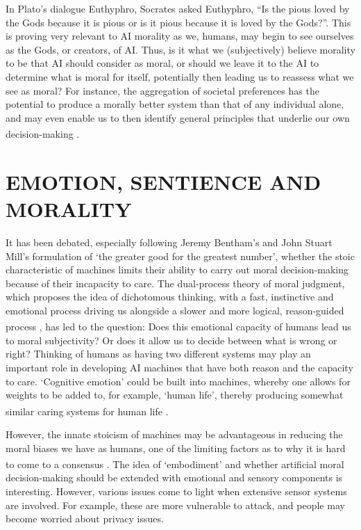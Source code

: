 \documentclass[10pt]{article}
\begin{document}
In Plato’s dialogue Euthyphro, Socrates asked Euthyphro, “Is the pious loved by the Gods because it is pious or is it pious because it is loved by the Gods?”. This is proving very relevant to AI morality as we, humans, may begin to see ourselves as the Gods, or creators, of AI. Thus, is it what we (subjectively) believe morality to be that AI should consider as moral, or should we leave it to the AI to determine what is moral for itself, potentially then leading us to reassess what we see as moral? For instance, the aggregation of societal preferences has the potential to produce a morally better system than that of any individual alone, and may even enable us to then identify general principles that underlie our own decision-making \textsuperscript{\cite{badea_establishing_2022}}.

\section{EMOTION, SENTIENCE AND MORALITY}

It has been debated, especially following Jeremy Bentham's and John Stuart Mill's formulation of ‘the greater good for the greatest number’, whether the stoic characteristic of machines limits their ability to carry out moral decision-making because of their incapacity to care. The dual-process theory of moral judgment, which proposes the idea of dichotomous thinking, with a fast, instinctive and emotional process driving us alongside a slower and more logical, reason-guided process \textsuperscript{\cite{wallach_moral_2009}}, has led to the question: Does this emotional capacity of humans lead us to moral subjectivity? Or does it allow us to decide between what is wrong or right? Thinking of humans as having two different systems may play an important role in developing AI machines that have both reason and the capacity to care. ‘Cognitive emotion’ could be built into machines, whereby one allows for weights to be added to, for example, ‘human life’, thereby producing somewhat similar caring systems for human life \textsuperscript{\cite{wallach_moral_2009}}.

However, the innate stoicism of machines may be advantageous in reducing the moral biases we have as humans, one of the limiting factors as to why it is hard to come to a consensus \textsuperscript{\cite{wallach_moral_2009}}. The idea of ‘embodiment’ and whether artificial moral decision-making should be extended with emotional and sensory components is interesting. However, various issues come to light when extensive sensor systems are involved. For example, these are more vulnerable to attack, and people may become worried about privacy issues.
\end{document}
